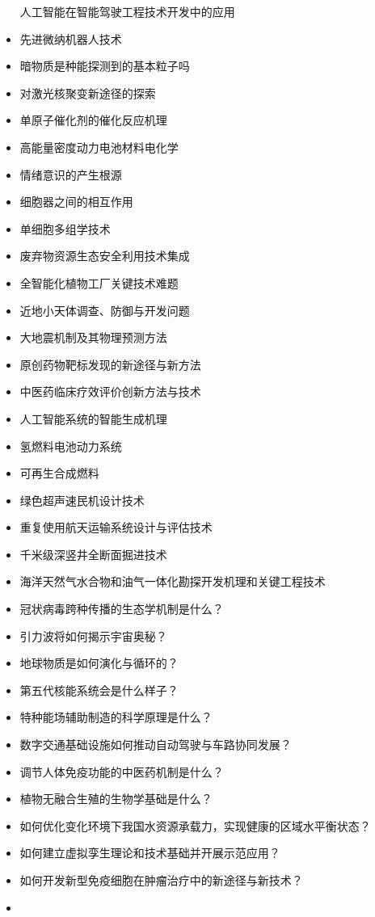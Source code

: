 \documentclass[]{tufte-book}
\begin{document}
\begin{itemize}
  人工智能在智能驾驶工程技术开发中的应用
\item
  先进微纳机器人技术
\item
  暗物质是种能探测到的基本粒子吗
\item
  对激光核聚变新途径的探索
\item
  单原子催化剂的催化反应机理
\item
  高能量密度动力电池材料电化学
\item
  情绪意识的产生根源
\item
  细胞器之间的相互作用
\item
  单细胞多组学技术
\item
  废弃物资源生态安全利用技术集成
\item
  全智能化植物工厂关键技术难题
\item
  近地小天体调查、防御与开发问题
\item
  大地震机制及其物理预测方法
\item
  原创药物靶标发现的新途径与新方法
\item
  中医药临床疗效评价创新方法与技术
\item
  人工智能系统的智能生成机理
\item
  氢燃料电池动力系统
\item
  可再生合成燃料
\item
  绿色超声速民机设计技术
\item
  重复使用航天运输系统设计与评估技术
\item
  千米级深竖井全断面掘进技术
\item
  海洋天然气水合物和油气一体化勘探开发机理和关键工程技术
\item
  冠状病毒跨种传播的生态学机制是什么？
\item
  引力波将如何揭示宇宙奥秘？
\item
  地球物质是如何演化与循环的？
\item
  第五代核能系统会是什么样子？
\item
  特种能场辅助制造的科学原理是什么？
\item
  数字交通基础设施如何推动自动驾驶与车路协同发展？
\item
  调节人体免疫功能的中医药机制是什么？
\item
  植物无融合生殖的生物学基础是什么？
\item
  如何优化变化环境下我国水资源承载力，实现健康的区域水平衡状态？
\item
  如何建立虚拟孪生理论和技术基础并开展示范应用？
\item
  如何开发新型免疫细胞在肿瘤治疗中的新途径与新技术？
\item

\end{itemize}
\end{document}

